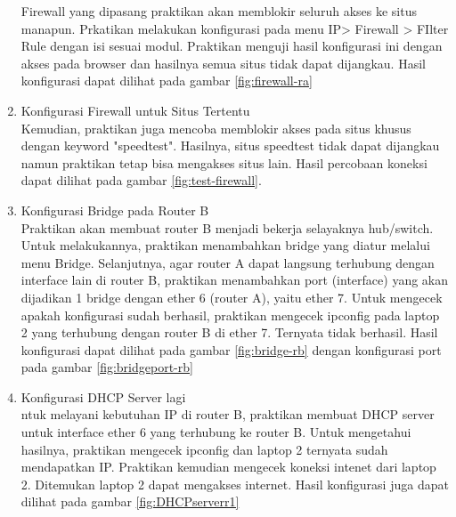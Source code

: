 \begin{enumerate}
  Firewall yang dipasang praktikan akan memblokir seluruh akses ke situs manapun. Prkatikan melakukan konfigurasi pada menu IP> Firewall > FIlter Rule dengan isi sesuai modul. Praktikan menguji hasil konfigurasi ini dengan akses pada browser dan hasilnya semua situs tidak dapat dijangkau. Hasil konfigurasi dapat dilihat pada gambar \ref{fig:firewall-ra}
  \item Konfigurasi Firewall untuk Situs Tertentu\\
  Kemudian, praktikan juga mencoba memblokir akses pada situs khusus dengan keyword "speedtest". Hasilnya, situs speedtest tidak dapat dijangkau namun praktikan tetap bisa mengakses situs lain. Hasil percobaan koneksi dapat dilihat pada gambar \ref{fig:test-firewall}.
  \item Konfigurasi Bridge pada Router B \\
  Praktikan akan membuat router B menjadi bekerja selayaknya hub/switch. Untuk melakukannya, praktikan menambahkan bridge yang diatur melalui menu Bridge. Selanjutnya, agar router A dapat langsung terhubung dengan interface lain di router B, praktikan menambahkan port (interface) yang akan dijadikan 1 bridge dengan ether 6 (router A), yaitu ether 7. Untuk mengecek apakah konfigurasi sudah berhasil, praktikan mengecek ipconfig pada laptop 2 yang terhubung dengan router B di ether 7. Ternyata tidak berhasil. Hasil konfigurasi dapat dilihat pada gambar \ref{fig:bridge-rb} dengan konfigurasi port pada gambar \ref{fig:bridgeport-rb}
  \item Konfigurasi DHCP Server lagi \\
  ntuk melayani kebutuhan IP di router B, praktikan membuat DHCP server untuk interface ether 6 yang terhubung ke router B. Untuk mengetahui hasilnya, praktikan mengecek ipconfig dan laptop 2 ternyata sudah mendapatkan IP. Praktikan kemudian mengecek koneksi intenet dari laptop 2. Ditemukan laptop 2 dapat mengakses internet. Hasil konfigurasi juga dapat dilihat pada gambar \ref{fig:DHCPserverr1}
\end{enumerate}

